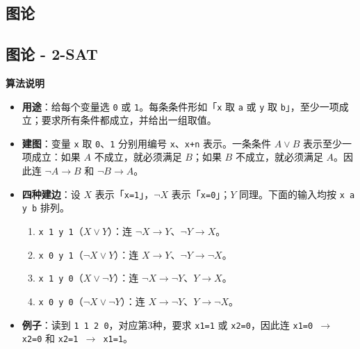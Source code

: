 \documentclass[10pt,landscape,a4paper]{article}
\begin{document}
\begin{multicols*}{3}
\section*{图论}
\subsection*{图论 - 2-SAT}
\par\addvspace{0.7ex}\noindent\textbf{算法说明}\par\nobreak
\begin{itemize}
\item \textbf{用途}：给每个变量选 \texttt{0} 或 \texttt{1}。每条条件形如「\texttt{x} 取 \texttt{a} 或 \texttt{y} 取 \texttt{b}」，至少一项成立；要求所有条件都成立，并给出一组取值。
\item \textbf{建图}：变量 \texttt{x} 取 \texttt{0}、\texttt{1} 分别用编号 \texttt{x}、\texttt{x\allowbreak{}+\allowbreak{}n} 表示。一条条件 $A\lor B$ 表示至少一项成立：如果 $A$ 不成立，就必须满足 $B$；如果 $B$ 不成立，就必须满足 $A$。因此连 $\neg A\to B$ 和 $\neg B\to A$。
\item \textbf{四种建边}：设 $X$ 表示「\texttt{x\allowbreak{}=\allowbreak{}1}」，$\neg X$ 表示「\texttt{x\allowbreak{}=\allowbreak{}0}」；$Y$ 同理。下面的输入均按 \texttt{x\allowbreak{} \allowbreak{}a\allowbreak{} \allowbreak{}y\allowbreak{} \allowbreak{}b} 排列。
\begin{enumerate}[start=1]
\item \texttt{x\allowbreak{} \allowbreak{}1\allowbreak{} \allowbreak{}y\allowbreak{} \allowbreak{}1}（$X\lor Y$）：连 $\neg X\to Y$、$\neg Y\to X$。
\item \texttt{x\allowbreak{} \allowbreak{}0\allowbreak{} \allowbreak{}y\allowbreak{} \allowbreak{}1}（$\neg X\lor Y$）：连 $X\to Y$、$\neg Y\to\neg X$。
\item \texttt{x\allowbreak{} \allowbreak{}1\allowbreak{} \allowbreak{}y\allowbreak{} \allowbreak{}0}（$X\lor\neg Y$）：连 $\neg X\to\neg Y$、$Y\to X$。
\item \texttt{x\allowbreak{} \allowbreak{}0\allowbreak{} \allowbreak{}y\allowbreak{} \allowbreak{}0}（$\neg X\lor\neg Y$）：连 $X\to\neg Y$、$Y\to\neg X$。
\end{enumerate}
\item \textbf{例子}：读到 \texttt{1\allowbreak{} \allowbreak{}1\allowbreak{} \allowbreak{}2\allowbreak{} \allowbreak{}0}，对应第3种，要求 \texttt{x\allowbreak{}1\allowbreak{}=\allowbreak{}1} 或 \texttt{x\allowbreak{}2\allowbreak{}=\allowbreak{}0}，因此连 \texttt{x\allowbreak{}1\allowbreak{}=\allowbreak{}0\allowbreak{} \allowbreak{}\ensuremath{\to}\allowbreak{} \allowbreak{}x\allowbreak{}2\allowbreak{}=\allowbreak{}0} 和 \texttt{x\allowbreak{}2\allowbreak{}=\allowbreak{}1\allowbreak{} \allowbreak{}\ensuremath{\to}\allowbreak{} \allowbreak{}x\allowbreak{}1\allowbreak{}=\allowbreak{}1}。

\end{itemize}
\end{multicols*}
\end{document}
